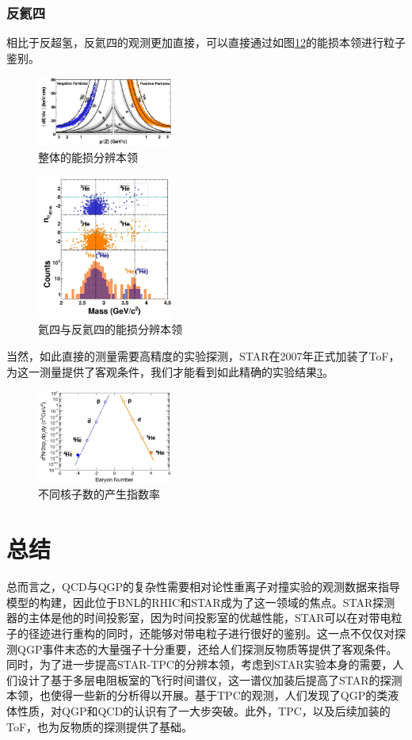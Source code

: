 \documentclass[%
 reprint,
 amsmath,amssymb,
 aps,
]{revtex4-1}
\begin{document}
\subsubsection{\label{sec:antihelium4}反氦四}
相比于反超氢，反氦四的观测\cite{Agakishiev:2011ib}更加直接，可以直接通过如图\ref{fig:dEdxAll}\ref{fig:dEdxHe4}的能损本领进行粒子鉴别。
\begin{figure}[htbp]
    \includegraphics[width=0.4\textwidth]{Plots/dEdxAll.png}
    \caption{\label{fig:dEdxAll}整体的能损分辨本领}
\end{figure}
\begin{figure}[htbp]
    \includegraphics[width=0.4\textwidth]{Plots/dEdxHe4.png}
    \caption{\label{fig:dEdxHe4}氦四与反氦四的能损分辨本领}
\end{figure}
当然，如此直接的测量需要高精度的实验探测，STAR在2007年正式加装了ToF，为这一测量提供了客观条件，我们才能看到如此精确的实验结果\ref{fig:He4Yield}。
\begin{figure}
    \includegraphics[width=0.4\textwidth]{Plots/He4Yield.png}
    \caption{\label{fig:He4Yield}不同核子数的产生指数率}
\end{figure}

\section{\label{sec:Sum}总结}
总而言之，QCD与QGP的复杂性需要相对论性重离子对撞实验的观测数据来指导模型的构建，因此位于BNL的RHIC和STAR成为了这一领域的焦点。STAR探测器的主体是他的时间投影室，因为时间投影室的优越性能，STAR可以在对带电粒子的径迹进行重构的同时，还能够对带电粒子进行很好的鉴别。这一点不仅仅对探测QGP事件末态的大量强子十分重要，还给人们探测反物质等提供了客观条件。同时，为了进一步提高STAR-TPC的分辨本领，考虑到STAR实验本身的需要，人们设计了基于多层电阻板室的飞行时间谱仪，这一谱仪加装后提高了STAR的探测本领，也使得一些新的分析得以开展。基于TPC的观测，人们发现了QGP的类液体性质，对QGP和QCD的认识有了一大步突破。此外，TPC，以及后续加装的ToF，也为反物质的探测提供了基础。


\end{document}
